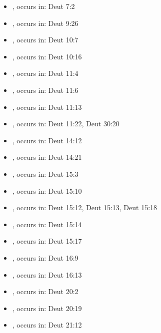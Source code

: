 \documentclass[14pt]{article}
\begin{document}
\begin{itemize}
\item {}, occurs in: Deut 7:2

\item {}, occurs in: Deut 9:26

\item {}, occurs in: Deut 10:7

\item {}, occurs in: Deut 10:16

\item {}, occurs in: Deut 11:4

\item {}, occurs in: Deut 11:6

\item {}, occurs in: Deut 11:13

\item {}, occurs in: Deut 11:22, Deut 30:20

\item {}, occurs in: Deut 14:12

\item {}, occurs in: Deut 14:21

\item {}, occurs in: Deut 15:3

\item {}, occurs in: Deut 15:10

\item {}, occurs in: Deut 15:12, Deut 15:13, Deut 15:18

\item {}, occurs in: Deut 15:14

\item {}, occurs in: Deut 15:17

\item {}, occurs in: Deut 16:9

\item {}, occurs in: Deut 16:13

\item {}, occurs in: Deut 20:2

\item {}, occurs in: Deut 20:19

\item {}, occurs in: Deut 21:12


\end{itemize}
\end{document}
